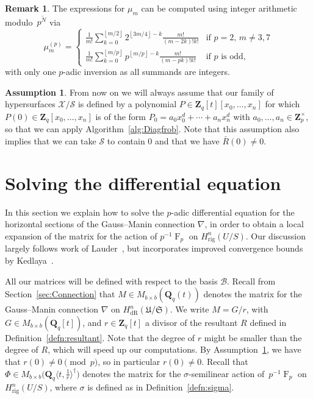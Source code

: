 \documentclass[a4paper,11pt]{article}
\numberwithin{equation}{section}
\providecommand{\floor}[1]{\left\lfloor#1\right\rfloor}   %
\newcommand{\ZZ}{\mathbf{Z}} %
\newcommand{\QQ}{\mathbf{Q}} %
\DeclareMathOperator{\Frob}{F}           %
\providecommand{\HdR}{H_{\text{dR}}}    %
\providecommand{\Hrig}{H_{\text{rig}}}  %
\providecommand{\cB}{\mathcal{B}} %
\theoremstyle{definition}
\newtheorem{rem}[thm]{Remark}
\newtheorem{assump}[thm]{Assumption}
\begin{document}
\begin{rem} \label{rem:mup}
The expressions for $\mu_m$ can be computed using integer arithmetic 
modulo~$p^{\tilde{N}}$ via 
\begin{equation*}
\mu_m^{(p)} = \begin{cases}
\frac{1}{m!} \sum_{k=0}^{\floor{m/2}} 2^{\floor{3m/4} - k} \frac{m!}{(m-2k)! k!}
    & \text{if $p = 2$, $m \neq 3, 7$} \\
\frac{1}{m!} \sum_{k=0}^{\floor{m/p}} p^{\floor{m/p} - k} \frac{m!}{(m-pk)! k!}
    & \text{if $p$ is odd},
\end{cases}
\end{equation*}
with only one $p$-adic inversion as all summands are integers. 
\end{rem}

\begin{assump} \label{assump:diag}
From now on we will always assume that our family of 
hypersurfaces $\mathcal{X}/\mathcal{S}$ is defined by a 
polynomial $P \in \ZZ_q[t][x_0,\dotsc,x_n]$ for which 
$P(0) \in \ZZ_q[x_0,\dotsc,x_n]$ is of the form 
$P_0=a_0 x_0^d + \dotsb + a_n x_n^d$ with $a_0,\dotsc,a_n \in \ZZ_p^{\times}$, 
so that we can apply Algorithm~\ref{alg:Diagfrob}. Note that this assumption 
also implies that we can take $\mathcal{S}$ to contain $0$ and that we have 
$\bar{R}(0) \neq 0$.
\end{assump}


\section{Solving the differential equation}
\label{sec:DifferentialSystem}

In this section we explain how to solve the $p$-adic differential 
equation for the horizontal sections of the Gauss--Manin 
connection $\nabla$, in order to obtain a local expansion of the 
matrix for the action of $p^{-1} \Frob_p$ on $\Hrig^{n}(U/S)$.  
Our discussion largely follows work of Lauder~\citep{Lauder2006}, 
but incorporates improved convergence bounds by Kedlaya~\citep{Kedlaya2010}.

All our matrices will be defined with respect to the basis $\cB$. Recall from 
Section~\ref{sec:Connection} that $M \in M_{b \times b}(\QQ_q(t))$ denotes 
the matrix for the Gauss--Manin connection $\nabla$ on 
$\HdR^n(\mathfrak{U}/\mathfrak{S})$. We write $M = G/r$, with 
$G \in M_{b \times b}(\QQ_q[t])$, and $r \in \ZZ_q[t]$ a divisor of the 
resultant $R$ defined in Definition~\ref{defn:resultant}. Note that the 
degree of $r$ might be smaller than the degree of $R$, which will speed up 
our computations. By Assumption~\ref{assump:diag}, we have that 
$r(0) \neq 0 \pmod{p}$, so in particular $r(0) \neq 0$. Recall that 
$\Phi \in M_{b \times b} \bigl(\QQ_q \langle t,\frac{1}{r} \rangle^{\dag} \bigr)$ 
denotes the matrix for the $\sigma$-semilinear action of~$p^{-1} \Frob_p$ 
on $\Hrig^{n}(U/S)$, where $\sigma$ is defined as 
in Definition~\ref{defn:sigma}. 
\end{document}
